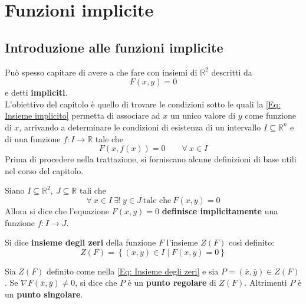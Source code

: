 \chapter{Funzioni implicite}
\section{Introduzione alle funzioni implicite}
Può spesso capitare di avere a che fare con insiemi di $\mathbb{R}^2$ descritti da
\begin{equation} \label{Eq: Insieme implicito}
    F(x,y)=0 
\end{equation}
e detti \textbf{impliciti}.\\
L'obiettivo del capitolo è quello di trovare le condizioni sotto le quali la \eqref{Eq: Insieme implicito} permetta di associare ad $x$ un unico valore di $y$ come funzione di $x$,  arrivando a determinare le condizioni di esistenza di un intervallo $I \subseteq \mathbb{R}^n$ e di una funzione $f: I \to \mathbb{R}$ tale che
\begin{equation} \label{Eq: Scopo capitolo 3}
    F(x, f(x))=0 \qquad \forall\ x \in I
\end{equation}
Prima di procedere nella trattazione, si forniscano alcune definizioni di base utili nel corso del capitolo.
\begin{definition} \label{Def: Funzione implicita}
    Siano $I \subseteq \mathbb{R}^2,\ J \subseteq \mathbb{R}$ tali che
    \begin{equation*}
        \forall\ x\in I\ \exists!\ y \in J\ \text{tale che}\ F(x,y)=0
    \end{equation*}
    Allora si dice che l'equazione $F(x,y)=0$ \textbf{definisce implicitamente} una funzione $f: I \to J$.
\end{definition}
\begin{definition} \label{Def: Insieme degli zeri}
    Si dice \textbf{insieme degli zeri} della funzione $F$ l'insieme $Z(F)$ così definito:
    \begin{equation} \label{Eq: Insieme degli zeri}
        Z(F)=\left\{(x,y) \in I \mid F(x, y)=0 \right\}
    \end{equation}
\end{definition}
\begin{definition}
    Sia $Z(F)$ definito come nella \eqref{Eq: Insieme degli zeri} e sia $P=(\overline{x}, \overline{y}) \in Z(F)$. Se $\nabla F(\overline{x}, \overline{y})\neq 0$, si dice che $P$ è un \textbf{punto regolare} di $Z(F)$. Altrimenti $P$ è un \textbf{punto singolare}.
\end{definition}
